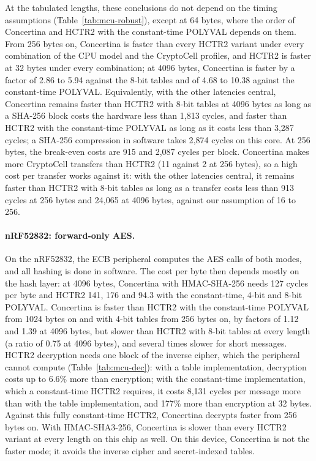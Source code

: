 At the tabulated lengths, these conclusions do not depend on the timing
assumptions (Table~\ref{tab:mcu-robust}), except at 64 bytes, where the
order of Concertina and HCTR2 with the constant-time POLYVAL depends on
them. From 256 bytes on, Concertina is faster than every HCTR2 variant under
every combination of the CPU model and the CryptoCell profiles, and HCTR2 is
faster at 32 bytes under every combination; at 4096 bytes, Concertina is
faster by a factor of 2.86 to
5.94 against the 8-bit tables and of
4.68 to 10.38 against the constant-time
POLYVAL. Equivalently, with the other latencies central,
Concertina remains faster than HCTR2 with 8-bit tables at 4096 bytes as long
as a SHA-256 block costs the hardware less than 1{,}813
cycles, and faster than HCTR2 with the constant-time POLYVAL as long as it
costs less than 3{,}287 cycles; a SHA-256 compression in
software takes 2{,}874 cycles on this core. At 256 bytes, the
break-even costs are 915 and 2{,}087
cycles per block. Concertina makes more CryptoCell transfers than HCTR2
(11 against 2 at 256 bytes), so a high
cost per transfer works against it: with the other latencies central, it
remains faster than HCTR2 with 8-bit tables as long as a transfer costs less
than 913 cycles at 256 bytes and 24{,}065
at 4096 bytes, against our assumption of 16 to
256.

\paragraph{nRF52832: forward-only AES.}
On the nRF52832, the ECB peripheral computes the AES calls of both modes,
and all hashing is done in software. The cost per byte then depends mostly on
the hash layer: at 4096 bytes, Concertina with HMAC-SHA-256 needs
127 cycles per byte and HCTR2 141, 176
and 94.3 with the constant-time, 4-bit and 8-bit POLYVAL.
Concertina is faster than HCTR2 with the constant-time POLYVAL from
1024 bytes on and with 4-bit tables from 256 bytes
on, by factors of 1.12 and 1.39 at
4096 bytes,
but slower than HCTR2 with 8-bit tables at every length (a ratio of
0.75 at 4096 bytes), and several times slower for short
messages. HCTR2 decryption needs one block of the inverse cipher, which the
peripheral cannot compute (Table~\ref{tab:mcu-dec}): with a table
implementation, decryption costs up to 6.6\% more than
encryption; with the constant-time implementation, which a constant-time
HCTR2 requires, it costs 8{,}131 cycles per message more than with
the table implementation, and 177\% more than encryption at 32
bytes. Against this fully constant-time HCTR2, Concertina decrypts faster
from 256 bytes on. With HMAC-SHA3-256, Concertina is slower
than every HCTR2 variant at every length on this chip as well. On this
device, Concertina is not the faster mode; it avoids the inverse cipher and
secret-indexed tables.

